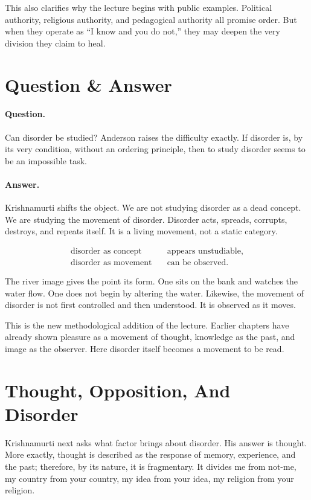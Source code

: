 \documentclass[11pt,oneside]{book}
\begin{document}
This also clarifies why the lecture begins with public examples. Political authority, religious authority, and pedagogical authority all promise order. But when they operate as ``I know and you do not,'' they may deepen the very division they claim to heal.

\section{Question \& Answer}

\paragraph{Question.}
Can disorder be studied? Anderson raises the difficulty exactly. If disorder is, by its very condition, without an ordering principle, then to study disorder seems to be an impossible task.

\paragraph{Answer.}
Krishnamurti shifts the object. We are not studying disorder as a dead concept. We are studying the movement of disorder. Disorder acts, spreads, corrupts, destroys, and repeats itself. It is a living movement, not a static category.

\begin{align}
\text{disorder as concept}
&\quad \text{appears unstudiable},\\
\text{disorder as movement}
&\quad \text{can be observed}.
\end{align}

The river image gives the point its form. One sits on the bank and watches the water flow. One does not begin by altering the water. Likewise, the movement of disorder is not first controlled and then understood. It is observed as it moves.

This is the new methodological addition of the lecture. Earlier chapters have already shown pleasure as a movement of thought, knowledge as the past, and image as the observer. Here disorder itself becomes a movement to be read.

\section{Thought, Opposition, And Disorder}

Krishnamurti next asks what factor brings about disorder. His answer is thought. More exactly, thought is described as the response of memory, experience, and the past; therefore, by its nature, it is fragmentary. It divides me from not-me, my country from your country, my idea from your idea, my religion from your religion.
\end{document}
